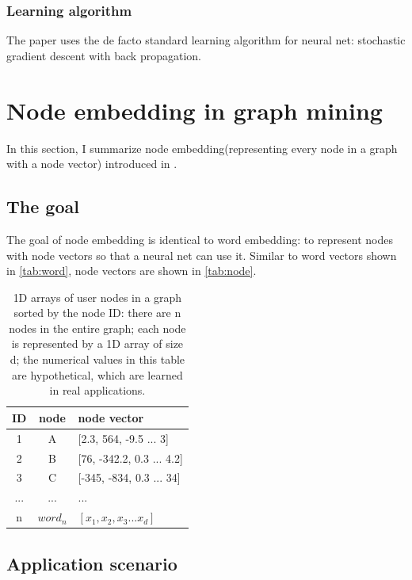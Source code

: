 \documentclass{article}
\begin{document}
\subsubsection{Learning algorithm}
The paper uses the de facto standard learning algorithm for neural net: stochastic gradient descent with back propagation\cite{lecun2012efficient}.

\section{Node embedding in graph mining}

In this section, I summarize node embedding(representing every node in a graph with a node vector) introduced in \cite{perozzi2014deepwalk}.

\subsection{The goal}

The goal of node embedding is identical to word embedding: to represent nodes with node vectors so that a neural net can use it. Similar to word vectors shown in \autoref{tab:word}, node vectors are shown in \autoref{tab:node}.

\begin{table}[h]
	\centering
	\begin{tabularx}{0.5\textwidth}{|c|c|X|} \hline
		ID & node & node vector \\ \hline
		1 & A & [2.3, 564, -9.5 ... 3] \\ \hline
		2 & B & [76, -342.2, 0.3 ... 4.2] \\ \hline
		3 & C & [-345, -834, 0.3 ... 34] \\ \hline
		... & ... & ... \\ \hline
		n & $ word_n $ & $ [x_1, x_2, x_3 ... x_d] $ \\ \hline
	\end{tabularx}
	\caption{1D arrays of user nodes in a graph sorted by the node ID: there are n nodes in the entire graph; each node is represented by a 1D array of size d; the numerical values in this table are hypothetical, which are learned in real applications.}
	\label{tab:node}
\end{table}

\subsection{Application scenario}
\end{document}
